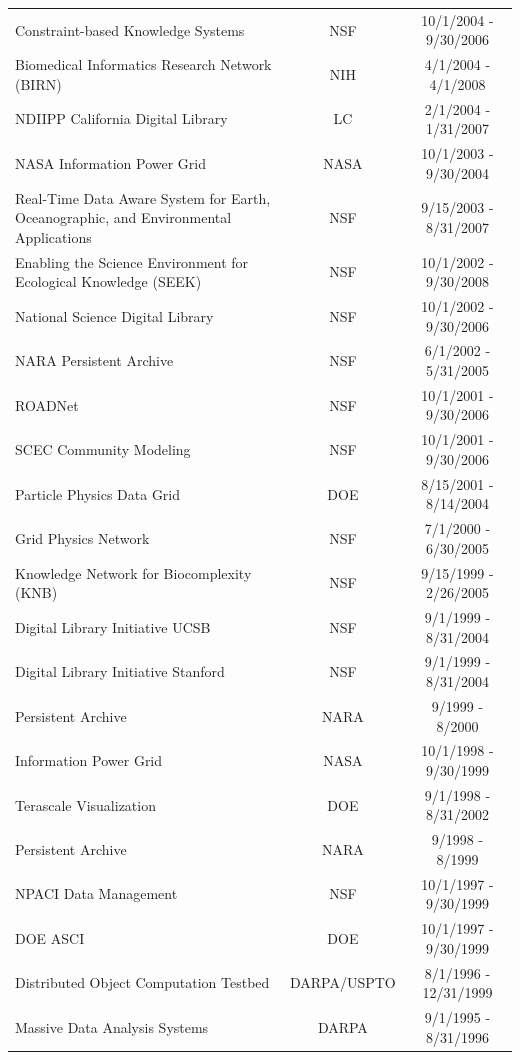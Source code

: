 \documentclass[10pt,oneside]{memoir}
\begin{document}
\begin{center}
{\begin{tabular}{ |>{\raggedright}p{11cm}|c|c| }
 Constraint-based Knowledge Systems & NSF & 10/1/2004 - 9/30/2006 \\
 Biomedical Informatics Research Network (BIRN) & NIH & 4/1/2004 - 4/1/2008 \\
 NDIIPP California Digital Library & LC & 2/1/2004 - 1/31/2007 \\
 NASA Information Power Grid & NASA & 10/1/2003 - 9/30/2004 \\
 Real-Time Data Aware System for Earth, Oceanographic, and Environmental Applications & NSF & 9/15/2003 - 8/31/2007 \\
 Enabling the Science Environment for Ecological Knowledge (SEEK) & NSF & 10/1/2002 - 9/30/2008 \\
 National Science Digital Library & NSF & 10/1/2002 - 9/30/2006 \\
 NARA Persistent Archive & NSF & 6/1/2002 - 5/31/2005 \\
 ROADNet & NSF & 10/1/2001 - 9/30/2006 \\
 SCEC Community Modeling & NSF & 10/1/2001 - 9/30/2006 \\
 Particle Physics Data Grid & DOE & 8/15/2001 - 8/14/2004 \\
 Grid Physics Network & NSF & 7/1/2000 - 6/30/2005 \\
 Knowledge Network for Biocomplexity (KNB) & NSF & 9/15/1999 - 2/26/2005 \\
 Digital Library Initiative UCSB & NSF & 9/1/1999 - 8/31/2004 \\
 Digital Library Initiative Stanford & NSF & 9/1/1999 - 8/31/2004 \\
 Persistent Archive & NARA & 9/1999 - 8/2000 \\
 Information Power Grid & NASA & 10/1/1998 - 9/30/1999 \\
 Terascale Visualization & DOE & 9/1/1998 - 8/31/2002 \\
 Persistent Archive & NARA & 9/1998 - 8/1999 \\
 NPACI Data Management & NSF & 10/1/1997 - 9/30/1999 \\
 DOE ASCI & DOE & 10/1/1997 - 9/30/1999 \\
 Distributed Object Computation Testbed & DARPA/USPTO & 8/1/1996 - 12/31/1999 \\
 Massive Data Analysis Systems & DARPA & 9/1/1995 - 8/31/1996 \\
 \hline
\end{tabular}
}
\end{center}


\newpage
\mainmatter
\end{document}
